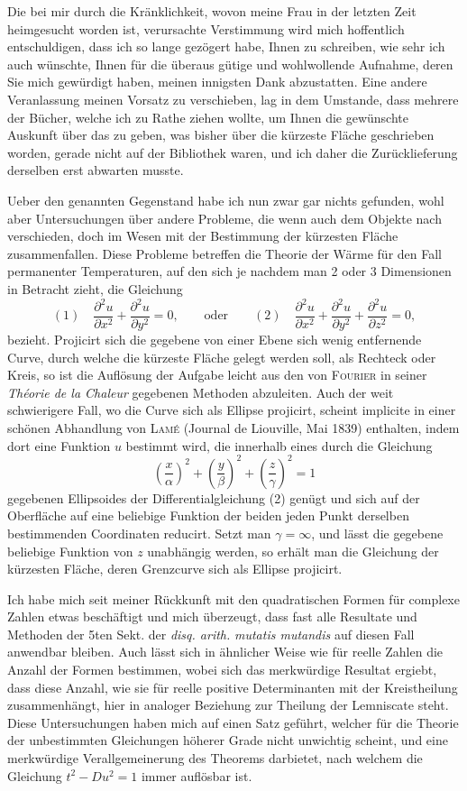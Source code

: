 \documentclass[11pt]{article}
\newcommand{\scn}[1]{\textsc{#1}}
\begin{document}
Die bei mir durch die Kränklichkeit, wovon meine Frau in der letzten Zeit heimgesucht worden ist, verursachte Verstimmung wird mich hoffentlich entschuldigen, dass ich so lange gezögert habe, Ihnen zu schreiben, wie sehr ich auch wünschte, Ihnen für die überaus gütige und wohlwollende Aufnahme, deren Sie mich gewürdigt haben, meinen innigsten Dank abzustatten. Eine andere Veranlassung meinen Vorsatz zu verschieben, lag in dem Umstande, dass mehrere der Bücher, welche ich zu Rathe ziehen wollte, um Ihnen die gewünschte Auskunft über das zu geben, was bisher über die kürzeste Fläche geschrieben worden, gerade nicht auf der Bibliothek waren, und ich daher die Zurücklieferung derselben erst abwarten musste.

Ueber den genannten Gegenstand habe ich nun zwar gar nichts gefunden, wohl aber Untersuchungen über andere Probleme, die wenn auch dem Objekte nach verschieden, doch im Wesen mit der Bestimmung der kürzesten Fläche zusammenfallen. Diese Probleme betreffen die Theorie der Wärme für den Fall permanenter Temperaturen, auf den sich je nachdem man 2 oder 3 Dimensionen in Betracht zieht, die Gleichung
\[
(1)\quad \frac{\partial^2u}{\partial x^2}+\frac{\partial^2u}{\partial y^2}=0,
\qquad\text{oder}\qquad
(2)\quad \frac{\partial^2u}{\partial x^2}+\frac{\partial^2u}{\partial y^2}+\frac{\partial^2u}{\partial z^2}=0,
\]
bezieht. Projicirt sich die gegebene von einer Ebene sich wenig entfernende Curve, durch welche die kürzeste Fläche gelegt werden soll, als Rechteck oder Kreis, so ist die Auflösung der Aufgabe leicht aus den von \scn{Fourier} in seiner \emph{Théorie de la Chaleur} gegebenen Methoden abzuleiten. Auch der weit schwierigere Fall, wo die Curve sich als Ellipse projicirt, scheint implicite in einer schönen Abhandlung von \scn{Lamé} (Journal de Liouville, Mai 1839) enthalten, indem dort eine Funktion $u$ bestimmt wird, die innerhalb eines durch die Gleichung
\[
 \left(\frac{x}{\alpha}\right)^2+\left(\frac{y}{\beta}\right)^2+\left(\frac{z}{\gamma}\right)^2=1
\]
gegebenen Ellipsoides der Differentialgleichung (2) genügt und sich auf der Oberfläche auf eine beliebige Funktion der beiden jeden Punkt derselben bestimmenden Coordinaten reducirt. Setzt man $\gamma=\infty$, und lässt die gegebene beliebige Funktion von $z$ unabhängig werden, so erhält man die Gleichung der kürzesten Fläche, deren Grenzcurve sich als Ellipse projicirt.

Ich habe mich seit meiner Rückkunft mit den quadratischen Formen für complexe Zahlen etwas beschäftigt und mich überzeugt, dass fast alle Resultate und Methoden der 5ten Sekt. der \emph{disq. arith.} \emph{mutatis mutandis} auf diesen Fall anwendbar bleiben. Auch lässt sich in ähnlicher Weise wie für reelle Zahlen die Anzahl der Formen bestimmen, wobei sich das merkwürdige Resultat ergiebt, dass diese Anzahl, wie sie für reelle positive Determinanten mit der Kreistheilung zusammenhängt, hier in analoger Beziehung zur Theilung der Lemniscate steht. Diese Untersuchungen haben mich auf einen Satz geführt, welcher für die Theorie der unbestimmten Gleichungen höherer Grade nicht unwichtig scheint, und eine merkwürdige Verallgemeinerung des Theorems darbietet, nach welchem die Gleichung $t^2-Du^2=1$ immer auflösbar ist.
\end{document}
